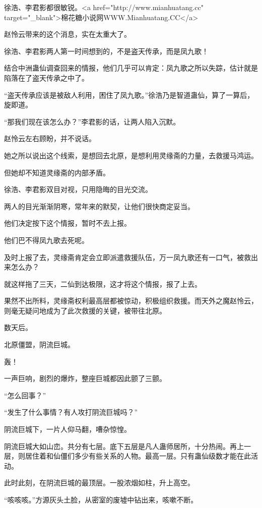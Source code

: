 
\begin{this_body}

徐浩、李君影都很敏锐。<a href="http://www.mianhuatang.cc" target="\_blank">棉花糖小说网WWW.Mianhuatang.CC</a>

赵怜云带来的这个消息，实在太重大了。

徐浩、李君影两人第一时间想到的，不是盗天传承，而是凤九歌！

结合中洲蛊仙调查回来的情报，他们几乎可以肯定：凤九歌之所以失踪，估计就是陷落在了盗天传承之中了。

“盗天传承应该是被敌人利用，困住了凤九歌。”徐浩乃是智道蛊仙，算了一算后，旋即道。

“那我们现在该怎么办？”李君影的话，让两人陷入沉默。

赵怜云左右顾盼，并不说话。

她之所以说出这个线索，是想回去北原，是想利用灵缘斋的力量，去救援马鸿运。

但她却不知道灵缘斋的内部矛盾。

徐浩、李君影双目对视，只用隐晦的目光交流。

两人的目光渐渐阴寒，常年来的默契，让他们很快商定妥当。

他们决定按下这个情报，暂时不去上报。

他们巴不得凤九歌去死呢。

及时上报了去，灵缘斋肯定会立即派遣救援队伍，万一凤九歌还有一口气，被救出来怎么办？

就这样拖了三天，二仙到达极限，这才将这个情报，报了上去。

果然不出所料，灵缘斋权利最高层都被惊动，积极组织救援。而天外之魔赵怜云，则毫无疑问地成为了此次救援的关键，被带往北原。

数天后。

北原僵盟，阴流巨城。

轰！

一声巨响，剧烈的爆炸，整座巨城都因此颤了三颤。

“怎么回事？”

“发生了什么事情？有人攻打阴流巨城吗？”

阴流巨城下，一片人仰马翻，嘈杂惊惶。

阴流巨城大如山峦。共分有七层。底下五层是凡人蛊师居所，十分热闹。再上一层，则居住着和仙僵们多少有些关系的人物。最高一层。只有蛊仙级数才能在此活动。

此时此刻，在阴流巨城的最顶层。一股浓烟如柱，升上高空。

“咳咳咳。”方源灰头土脸，从密室的废墟中钻出来，咳嗽不断。


\end{this_body}
